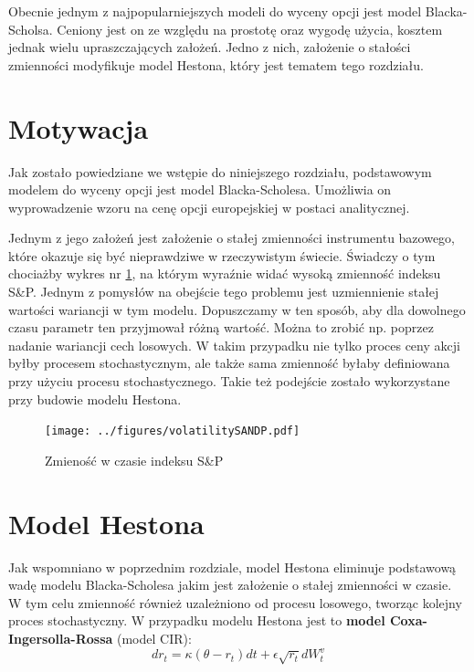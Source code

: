 \documentclass{pracamgr}
\begin{document}
Obecnie jednym z najpopularniejszych modeli do wyceny opcji jest model Blacka-Scholsa. Ceniony jest 
on ze względu na prostotę oraz wygodę użycia, kosztem jednak wielu upraszczających założeń. 
Jedno z nich, założenie o stałości zmienności modyfikuje model Hestona, który jest 
tematem tego rozdziału.


\section{Motywacja} 
Jak zostało powiedziane we wstępie do niniejszego rozdziału, podstawowym modelem do wyceny opcji jest 
model Blacka-Scholesa.
Umożliwia on wyprowadzenie wzoru na cenę opcji europejskiej w postaci analitycznej. 

Jednym z jego założeń jest założenie o stałej zmienności instrumentu bazowego, które okazuje się
być nieprawdziwe w rzeczywistym świecie. Świadczy o tym chociażby
wykres nr \ref{fig:vix}, na którym wyraźnie widać wysoką zmienność indeksu S\&P. Jednym z pomysłów na
obejście tego problemu jest uzmiennienie stałej wartości wariancji w tym modelu. Dopuszczamy w ten 
sposób, aby dla dowolnego czasu parametr ten przyjmował różną wartość. Można to zrobić np. poprzez 
nadanie wariancji cech losowych. W takim przypadku nie tylko proces ceny akcji byłby procesem 
stochastycznym, ale także sama zmienność byłaby definiowana przy użyciu procesu stochastycznego. 
Takie też podejście zostało wykorzystane przy budowie modelu Hestona.



\begin{figure}
  \centering  
  \texttt{[image: ../figures/volatilitySANDP.pdf]}
  \caption{Zmieność w czasie indeksu S\&P}\label{fig:vix}
\end{figure} 

\section{Model Hestona}
Jak wspomniano w poprzednim rozdziale, model Hestona eliminuje podstawową wadę modelu Blacka-Scholesa 
jakim jest założenie o stałej zmienności w czasie.
W tym celu zmienność również uzależniono od procesu losowego, tworząc kolejny proces stochastyczny. W 
przypadku modelu Hestona jest to \textbf{model Coxa-Ingersolla-Rossa} 
\cite{CoxIngersollRoss} (model CIR):
\begin{equation}
dr_t  = \kappa (\theta  - r_t)dt + \epsilon \sqrt{r_t} dW_t^v 
\end{equation}
\end{document}
